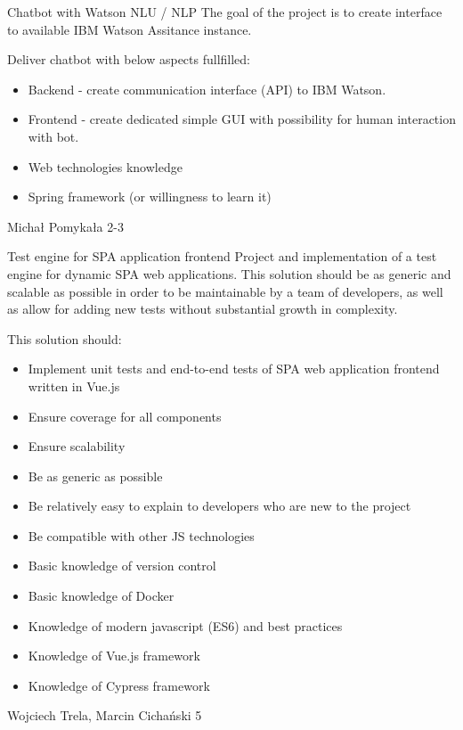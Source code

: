 \begin{project}
{Chatbot with Watson NLU / NLP}
{
The goal of the project is to create interface to available IBM Watson Assitance instance.
}
{
Deliver chatbot with below aspects fullfilled:
\begin{itemize}
	\item Backend - create communication interface (API) to IBM Watson.
	\item Frontend - create dedicated simple GUI with possibility for human interaction with bot.
\end{itemize}
}
{
\begin{itemize}
	\item Web technologies knowledge
	\item Spring framework (or willingness to learn it)
\end{itemize}
}
{Michał Pomykała}
{2-3}
\end{project}
\begin{project}
{Test engine for SPA application frontend}
{Project and implementation of a test engine for dynamic SPA web applications. This solution should be as generic and scalable as possible in order to be maintainable by a team of developers, as well as allow for adding new tests without substantial growth in complexity.} 
{
This solution should:
\begin{itemize}
	\item Implement unit tests and end-to-end tests of SPA web application frontend written in Vue.js
	\item Ensure coverage for all components
	\item Ensure scalability
	\item Be as generic as possible
	\item Be relatively easy to explain to developers who are new to the project
	\item Be compatible with other JS technologies
\end{itemize}
}
{
\begin{itemize}
	\item Basic knowledge of version control
	\item Basic knowledge of Docker
	\item Knowledge of modern javascript (ES6) and best practices
	\item Knowledge of Vue.js framework
	\item Knowledge of Cypress framework
\end{itemize}
}
{Wojciech Trela, Marcin Cichański}
{5}
\end{project}
